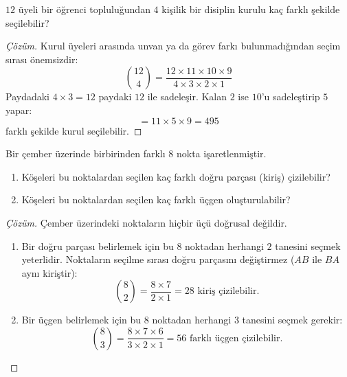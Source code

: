 \begin{example}
$12$ üyeli bir öğrenci topluluğundan $4$ kişilik bir disiplin kurulu kaç farklı şekilde seçilebilir?
\end{example}
\begin{proof}[Çözüm]
Kurul üyeleri arasında unvan ya da görev farkı bulunmadığından seçim sırası önemsizdir:
\[ \binom{12}{4} = \frac{12 \times 11 \times 10 \times 9}{4 \times 3 \times 2 \times 1} \]
Paydadaki $4 \times 3 = 12$ paydaki $12$ ile sadeleşir. Kalan $2$ ise $10$'u sadeleştirip $5$ yapar:
\[ = 11 \times 5 \times 9 = 495 \]
farklı şekilde kurul seçilebilir.
\end{proof}

\begin{example}
Bir çember üzerinde birbirinden farklı $8$ nokta işaretlenmiştir.
\begin{enumerate}
  \item Köşeleri bu noktalardan seçilen kaç farklı doğru parçası (kiriş) çizilebilir?
  \item Köşeleri bu noktalardan seçilen kaç farklı üçgen oluşturulabilir?
\end{enumerate}
\end{example}
\begin{proof}[Çözüm]
Çember üzerindeki noktaların hiçbir üçü doğrusal değildir.
\begin{enumerate}
  \item Bir doğru parçası belirlemek için bu $8$ noktadan herhangi $2$ tanesini seçmek yeterlidir. Noktaların seçilme sırası doğru parçasını değiştirmez ($AB$ ile $BA$ aynı kiriştir):
  \[ \binom{8}{2} = \frac{8 \times 7}{2 \times 1} = 28 \text{ kiriş çizilebilir.} \]
  
  \item Bir üçgen belirlemek için bu $8$ noktadan herhangi $3$ tanesini seçmek gerekir:
  \[ \binom{8}{3} = \frac{8 \times 7 \times 6}{3 \times 2 \times 1} = 56 \text{ farklı üçgen çizilebilir.} \]
\end{enumerate}
\end{proof}

